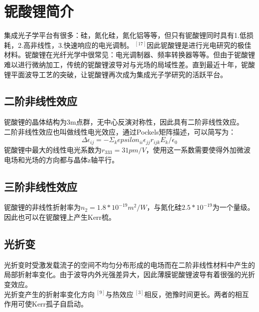 \section{铌酸锂简介}
集成光子学平台有很多：硅，氮化硅，氮化铝等等，但只有铌酸锂同时具有1.低损耗，2.高非线性，3.快速响应的电光调制。$~^{[17]}$因此铌酸锂是进行光电研究的极佳材料。铌酸锂在光纤光学中很常见：电光调制器、频率转换器等等。但由于铌酸锂难以进行微纳加工，传统的铌酸锂波导对与光场的局域性差。直到最近十年，铌酸锂平面波导工艺的突破，让铌酸锂再次成为集成光子学研究的活跃平台。
\subsection{二阶非线性效应}
铌酸锂的晶体结构为3m点群，无中心反演对称性，因此具有二阶非线性效应。\\
二阶非线性效应也叫做线性电光效应，通过Pockels矩阵描述，可以简写为：
\[\Delta \epsilon_{ij} = -\Sigma_k epsilon_{ii}\epsilon_{jj}r_{ijk}E_k/\epsilon_0\]
铌酸锂中最大的线性电光系数为$r_{333} = 31pm/V$，使用这一系数需要使得外加微波电场和光场的方向都与晶体z轴平行。
\subsection{三阶非线性效应}
铌酸锂的非线性折射率为$n_2 = 1.8*10^{-19}m^2/W$，与氮化硅$2.5*10^{-19}$为一个量级。因此也可以在铌酸锂上产生Kerr梳。
\subsection{光折变}
光折变时受激发载流子的空间不均匀分布形成的电场而在二阶非线性材料中产生的局部折射率变化。由于波导内外光强差异大，因此薄膜铌酸锂波导有着很强的光折变效应。\\
光折变产生的折射率变化方向$~^{[9]}$与热效应$~^{[3]}$相反，弛豫时间更长。两者的相互作用可使Kerr孤子自启动。
